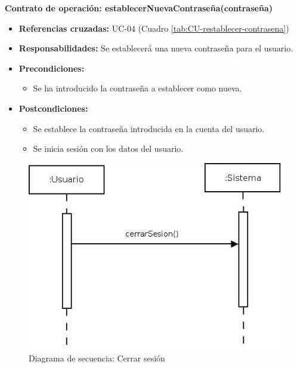 \textbf{Contrato de operación: establecerNuevaContraseña(contraseña)}
\begin{itemize}
\item \textbf{Referencias cruzadas:} UC-04 (Cuadro \ref{tab:CU-restablecer-contrasena})
\item \textbf{Responsabilidades:} Se establecerá una nueva contraseña para el usuario.
\item \textbf{Precondiciones:} 
 \begin{itemize}
\item Se ha introducido la contraseña a establecer como nueva.
\end {itemize}
\item \textbf{Postcondiciones:} 
 \begin{itemize}
\item Se establece la contraseña introducida en la cuenta del usuario.
\item Se inicia sesión con los datos del usuario. 
\end {itemize}
\end {itemize}


\vspace{7mm}
\dotfill
\vspace{7mm}

\begin{figure}[h!]
\centering
  \includegraphics[scale=.55]{img/secuencias/gestion-usuarios-cerrar-sesion.jpeg}
  \caption{Diagrama de secuencia: Cerrar sesión}
  \label{fig:secuencia-gestion-usuarios-cerrar-sesion}
\end{figure}


